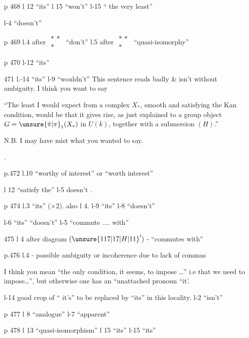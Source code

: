 
p 468 l 12 ``its'' \quad l 15 ``won't'' \quad l-15 `` the very least''

l-4 ``doesn't''

p 469 l.4 after $\substack{\ast\,\ast\\ \ast}$ ``don't'' \quad l.5 after $\substack{\ast\,\ast\\ \ast}$ ``quasi-isomorphy''

p 470 l-12 ``its''

471 l.-14 ``its'' \quad l-9 ``wouldn't'' This sentence reads  badly  \& isn't without ambiguity. I think you want to say

 \quad ``The least I would expect from a complex $X_{\ast}$, smooth and satisfying the Kan condition, would be that it gives rise, as just explained to a group object $G=\unsure{\bar{\pi}|\pi}_{1}(X_{\ast})$ in $U(k)$, together with a submersion $(H)$.''

N.B. I may have mist what you wanted to say.

.

p.472 l.10 ``worthy of interest'' or ``worth interest''

l 12 ``satisfy the'' \quad l-5 doesn't .

p 474 l.3 ``its'' ($\times 2$). also l 4. \quad l-9 ``its'' \quad l-8 ``doesn't''

l-6 ``its'' ``doesn't'' \quad l-5 ``commute .... with''

475 l 4 after diagram $(\unsure{117|17|H|11}')$ - ``commutes with''

p.476  l.4 -  possible ambiguity or incoherence due to lack of commas

I think you mean ``the only condition, it seems, to impose \ldots'' i.e that we need to impose\ldots'', but otherwise one has an ``unattached pronoun ``it'.

l-14 good crop of `` it's'' to be replaced by ``its'' in this locality. \quad l-2 ``isn't''

p 477 l 8 ``analogue'' \quad l-7 ``apparent''

p 478 l 13 ``quasi-isomorphism'' \quad l 15 ``its'' \quad l-15 ``its''

